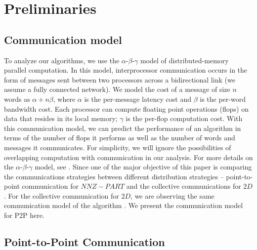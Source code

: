 \section{Preliminaries}


\subsection{Communication model}
\label{sec:comm-model}

To analyze our algorithms, we use the $\alpha$-$\beta$-$\gamma$ model of distributed-memory parallel computation.
In this model, interprocessor communication occurs in the form of messages sent between two processors across a bidirectional link (we assume a fully connected network).
We model the cost of a message of size $n$ words as $\alpha+n\beta$, where $\alpha$ is the per-message latency cost and $\beta$ is the per-word bandwidth cost.
Each processor can compute floating point operations (flops) on data that resides in its local memory; $\gamma$ is the per-flop computation cost.
With this communication model, we can predict the performance of an algorithm in terms of the number of flops it performs as well as the number of words and messages it communicates.
For simplicity, we will ignore the possibilities of overlapping computation with communication in our analysis.
For more details on the $\alpha$-$\beta$-$\gamma$ model, see \cite{TRG05,CH+07}. Since one of the major objective of this paper is comparing the communications strategies between different distribution strategies -- point-to-point communication for $NNZ-PART$ and the collective communications for $2D$. For the collective communication for $2D$, we are observing the same communication model of the \mpifaun algorithm \cite{KBP16, KBP16MPIFAUN}. We present the communication model for P2P here. 

\subsection{Point-to-Point Communication}


